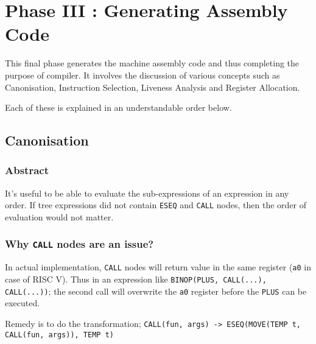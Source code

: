 \chapter{Phase III : Generating Assembly Code}

This final phase generates the machine assembly code and thus completing the purpose of compiler. 
It involves the discussion of various concepts such as Canonisation, Instruction Selection, Liveness Analysis and Register Allocation.

Each of these is explained in an understandable order below.

\section{Canonisation}


\hypertarget{abstract}{%
\subsection{Abstract}\label{abstract}}

It's useful to be able to evaluate the sub-expressions of an expression
in any order. If tree expressions did not contain
\texttt{ESEQ}
and
\texttt{CALL}
nodes, then the order of evaluation would not matter.

\hypertarget{why-call-nodes-are-an-issue}{%
\subsection{\texorpdfstring{Why
\texttt{CALL}
nodes are an
issue?}{Why  nodes are an issue?}}\label{why-call-nodes-are-an-issue}}

In actual implementation,
\texttt{CALL}
nodes will return value in the same register
(\texttt{a0} in
case of RISC V). Thus in an expression like
\texttt{BINOP(PLUS, CALL(...), CALL(...))};
the second call will overwrite the
\texttt{a0}
register before the
\texttt{PLUS}
can be executed.

Remedy is to do the transformation;
\texttt{CALL(fun, args) -> ESEQ(MOVE(TEMP t, CALL(fun, args)), TEMP t)}

